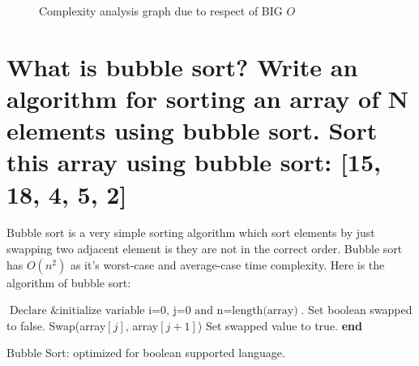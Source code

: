\documentclass[11 pt]{article}
\begin{document}
	\begin{figure}[h!]
	\centering
	\caption{Complexity analysis graph due to respect of BIG $O$}
	\end{figure}

\pagebreak

\section{What is bubble sort? Write an algorithm for sorting an array of N elements using bubble sort. Sort this array using bubble sort: [15, 18, 4, 5, 2]}
\justify
{
 Bubble sort is a very simple sorting algorithm which sort elements by just swapping two adjacent element is they are not in the correct order. Bubble sort has $O(n^2)$ as it's worst-case and average-case time complexity. Here is the algorithm of bubble sort:
}
\begin{algorithm}
\DontPrintSemicolon
{}
\Begin
{
$\textrm{Declare \& initialize variable i=0, j=0 and n}=\textrm{length(array)}$.\;
Set boolean swapped to false.\;
{
	{
		{
			Swap(array$[j]$, array$[j+1]$)\;
			Set swapped value to true.
		}
	}
}
}
\textbf{end}
\caption{Bubble Sort: optimized for boolean supported language.}
\end{algorithm}
\end{document}
